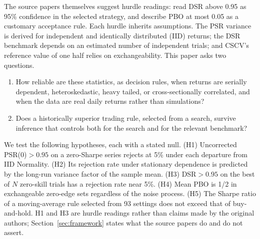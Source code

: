 \documentclass[11pt,a4paper]{article}
\theoremstyle{remark}
\begin{document}
The source papers themselves suggest hurdle readings: \citet[p.~10]{bailey2014dsr} read DSR above 0.95 as 95\% confidence in the selected strategy, and \citet[p.~14]{bailey2017pbo} describe PBO at most 0.05 as a customary acceptance rule. Each hurdle inherits assumptions. The PSR variance is derived for independent and identically distributed (IID) returns; the DSR benchmark depends on an estimated number of independent trials; and CSCV's reference value of one half relies on exchangeability. This paper asks two questions.

\begin{enumerate}
\item[\textbf{Q1.}] How reliable are these statistics, as decision rules, when returns are serially dependent, heteroskedastic, heavy tailed, or cross-sectionally correlated, and when the data are real daily returns rather than simulations?
\item[\textbf{Q2.}] Does a historically superior trading rule, selected from a search, survive inference that controls both for the search and for the relevant benchmark?
\end{enumerate}

\noindent We test the following hypotheses, each with a stated null. (H1) Uncorrected PSR(0)$>0.95$ on a zero-Sharpe series rejects at 5\% under each departure from IID Normality. (H2) Its rejection rate under stationary dependence is predicted by the long-run variance factor of the sample mean. (H3) DSR$>0.95$ on the best of $N$ zero-skill trials has a rejection rate near 5\%. (H4) Mean PBO is 1/2 in exchangeable zero-edge sets regardless of the noise process. (H5) The Sharpe ratio of a moving-average rule selected from 93 settings does not exceed that of buy-and-hold. H1 and H3 are hurdle readings rather than claims made by the original authors; Section~\ref{sec:framework} states what the source papers do and do not assert.
\end{document}
